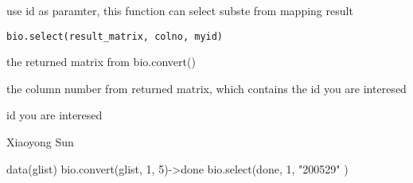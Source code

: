 \begin{Description}\relax
use id as paramter, this function can select subste from mapping result
\end{Description}
\begin{Usage}
\begin{verbatim}
bio.select(result_matrix, colno, myid)
\end{verbatim}
\end{Usage}
\begin{Arguments}
\begin{ldescription}
\item[\code{result\_matrix}] the returned matrix from bio.convert() 
\item[\code{colno}] the column number from returned matrix, which contains the id you are interesed 
\item[\code{myid}] id you are interesed 
\end{ldescription}
\end{Arguments}
\begin{Author}\relax
Xiaoyong Sun
\end{Author}
\begin{Examples}
\begin{ExampleCode}
data(glist)
bio.convert(glist, 1, 5)->done
bio.select(done, 1, "200529" )
\end{ExampleCode}
\end{Examples}

